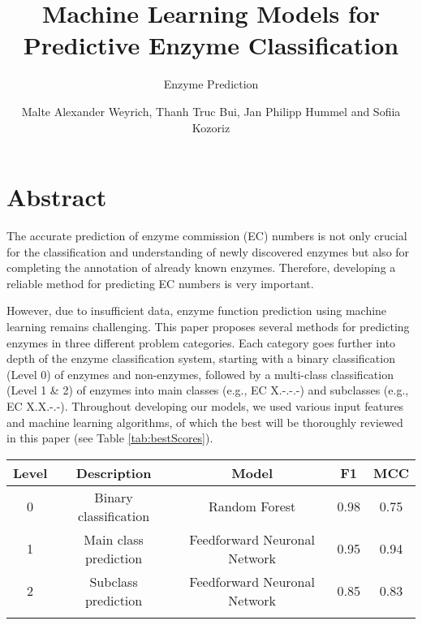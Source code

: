\documentclass{bioinfo}
\begin{document}

\subtitle{Enzyme Prediction}

\title[]{Machine Learning Models for Predictive Enzyme Classification}
\author[]{Malte Alexander Weyrich, Thanh Truc Bui, Jan Philipp Hummel
and  Sofiia Kozoriz}

\address{}
\corresp{}
\history{}
\editor{}

\abstract{}

\maketitle


\section{Abstract}
The accurate prediction of enzyme commission (EC) numbers is not only crucial for 
the classification and understanding of newly discovered enzymes but also for completing the annotation of already known enzymes.
Therefore, developing a reliable method for predicting EC numbers is very important.

However, due to insufficient data, enzyme function prediction using machine learning remains challenging.
This paper proposes several methods for predicting enzymes in three different problem categories. Each category goes further into depth
of the enzyme classification system, starting with a binary classification (Level 0) of enzymes and non-enzymes, followed by a multi-class classification (Level 1 \& 2) of enzymes into main classes (e.g., EC X.-.-.-) and subclasses (e.g., EC X.X.-.-).
Throughout developing our models, we used various input features and machine learning algorithms, of which the best will be thoroughly reviewed in this paper (see Table \ref{tab:bestScores}).

\begin{table}[!htbp]
 {\begin{tabular}{@{}ccccc@{}}\toprule 
		Level & Description & Model & F1 & MCC \\\midrule
		0 & Binary classification & Random Forest & 0.98 & 0.75 \\
		1 & Main class prediction &  Feedforward Neuronal Network & 0.95 & 0.94 \\
		2 & Subclass prediction&  Feedforward Neuronal Network & 0.85 & 0.83 \\\botrule
\end{tabular}}{}
\end{table}
\end{document}
